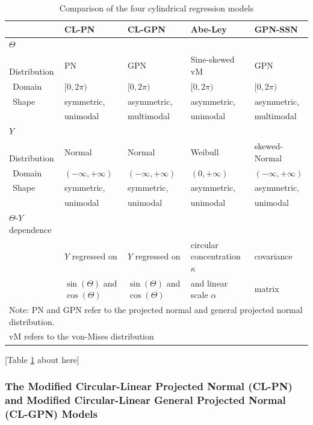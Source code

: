 \documentclass[man,mask]{apa6}
\begin{document}
\begin{table}
\centering
\caption{Comparison of the four cylindrical regression models} 
\begin{tabular}{lllll}
  \noalign{\smallskip}\hline\noalign{\smallskip}
\multicolumn{1}{l}{Aspect} & CL-PN & CL-GPN  & Abe-Ley  & GPN-SSN \\ \hline\noalign{\smallskip}
$\Theta$ & &&&\\
$\:\:$Distribution& PN & GPN & Sine-skewed vM & GPN\\
$\:\:$Domain & $[0, 2\pi)$ & $[0, 2\pi)$ & $[0, 2\pi)$ & $[0, 2\pi)$\\
$\:\:$Shape & symmetric, & asymmetric, & asymmetric, & asymmetric, \\
            & unimodal  & multimodal & unimodal   & multimodal \\\hline\noalign{\smallskip}
$Y$& &&&\\
$\:\:$Distribution & Normal & Normal & Weibull & skewed-Normal\\
$\:\:$Domain & $(-\infty, + \infty)$ & $(-\infty, + \infty)$ & $(0, + \infty)$ & $(-\infty, + \infty)$\\
$\:\:$Shape & symmetric, & symmetric, & asymmetric, & asymmetric, \\
            & unimodal  & unimodal  & unimodal   & unimodal\\\hline\noalign{\smallskip}
$\Theta$-$Y$ dependence &                                   &                                   & & \\
                        & $Y$ regressed on                  & $Y$ regressed on                  & circular concentration $\kappa$  & covariance \\
                        & $\sin(\Theta)$ and $\cos(\Theta)$ & $\sin(\Theta)$ and $\cos(\Theta)$ & and linear scale $\alpha$ & matrix\\\hline
\multicolumn{5}{l}{Note: PN and GPN refer to the projected normal and general projected normal distribution.}\\
\multicolumn{5}{l}{vM refers to the von-Mises distribution}\\

\end{tabular}
\label{TableModels}
\end{table}

\hfil [Table \ref{TableModels} about here] \hfil

\subsubsection{The Modified Circular-Linear Projected Normal (CL-PN) and Modified Circular-Linear General Projected Normal (CL-GPN) Models}\label{CL-(G)PN}
\end{document}
